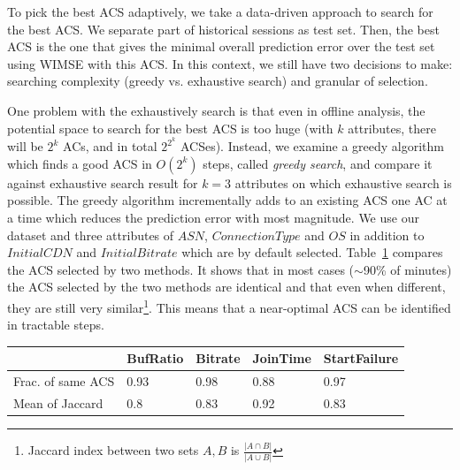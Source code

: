 To pick the best ACS adaptively, we take a data-driven approach to search for the best ACS. %
We separate part of historical sessions as test set. Then, the best ACS is the one that gives the minimal overall prediction error over the test set using WIMSE with this ACS. In this context, we still have two decisions to make: searching complexity (greedy vs. exhaustive search) and granular of selection.

 One problem with the exhaustively search is that even in offline analysis, the potential space to search for the best ACS is too huge (with $k$ attributes, there will be $2^k$ ACs, and in total $2^{2^k}$ ACSes). Instead, we examine a greedy algorithm which finds a good ACS in $O(2^k)$ steps, called {\it greedy search}, and compare it against exhaustive search result for $k=3$ attributes on which exhaustive search is possible. The greedy algorithm incrementally adds to an existing ACS one AC at a time which reduces the prediction error with most magnitude.
We use our dataset and three attributes of $ASN$, $ConnectionType$ and $OS$ in addition to $Initial CDN$ and $Initial Bitrate$ which are by default selected.
Table~\ref{tab:greedy-exhaustive} compares the ACS selected by two methods. It shows that in most cases ($\sim$90\% of minutes) the ACS selected by the two methods are identical and that even when different, they are still very similar\footnote{Jaccard index between two sets $A,B$ is $\frac{|A\cap B|}{|A\cup B|}$}. This means that a near-optimal ACS can be identified in tractable steps.


\begin{table}[t]
\begin{center}
\begin{small}
\begin{tabular}{p{2.2cm}|p{1.1cm}|p{1.1cm}|p{1.1cm}|p{1.1cm}}
		& BufRatio & Bitrate & JoinTime & StartFailure\\ \hline 
Frac. of same ACS & 0.93 & 0.98 & 0.88 & 0.97 \\
Mean of Jaccard & 0.8 & 0.83 & 0.92 & 0.83 \\
\end{tabular}
\end{small}
\end{center}
\label{tab:greedy-exhaustive}
\end{table}

